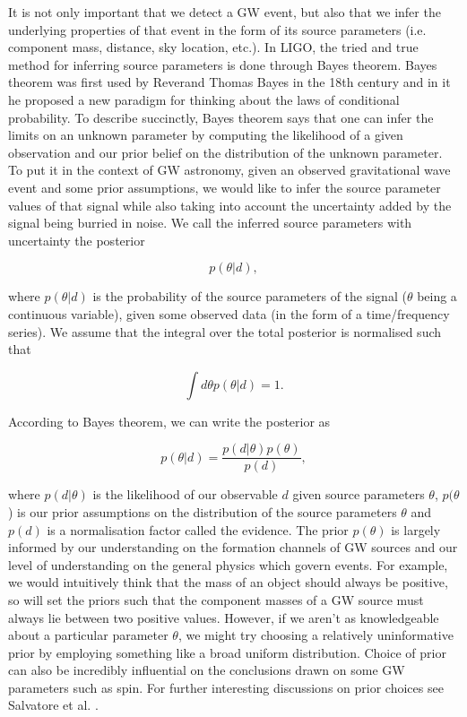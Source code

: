 %
%
It is not only important that we detect a \ac{GW} event, but also that we infer the underlying properties of that event in the form of its source parameters (i.e. component mass, distance, sky location, etc.). In \ac{LIGO}, the tried and true method for inferring source parameters is done through Bayes theorem. Bayes theorem was first used by Reverand Thomas Bayes in the 18th century and in it he proposed a new paradigm for thinking about the laws of conditional probability. To describe succinctly, Bayes theorem says that one can infer the limits on an unknown parameter by computing the likelihood of a given observation and our prior belief on the distribution of the unknown parameter. To put it in the context of \ac{GW} astronomy, given an observed gravitational wave event and some prior assumptions, we would like to infer the source parameter values of that signal while also taking into account the uncertainty added by the signal being burried in noise. We call the inferred source parameters with uncertainty the posterior 

%
%
\begin{equation}
    p(\theta | d),
\end{equation}

where $p(\theta | d)$ is the probability of the source parameters of the signal ($\theta$ being a continuous variable), given some observed data (in the form of a time/frequency series). We assume that the integral over the total posterior is normalised such that 

%
%
\begin{equation}
    \int d\theta p(\theta | d) = 1.
\end{equation}

According to Bayes theorem, we can write the posterior as 

%
%
\begin{equation}
    p(\theta | d) = \frac{p(d|\theta)p(\theta)}{p(d)},
\end{equation}

%
%
where $p(d|\theta)$ is the likelihood of our observable $d$ given source parameters $\theta$, $p(\theta$) is our prior assumptions on the distribution of the source parameters $\theta$ and $p(d)$ is a normalisation factor called the evidence. The prior $p(\theta)$ is largely informed by our understanding on the formation channels of \ac{GW} sources and our level of understanding on the general physics which govern events. For example, we would intuitively think that the mass of an object should always be positive, so will set the priors such that the component masses of a \ac{GW} source must always lie between two positive values. However, if we aren't as knowledgeable about a particular parameter $\theta$, we might try choosing a relatively uninformative prior by employing something like a broad uniform distribution. Choice of prior can also be incredibly influential on the conclusions drawn on some \ac{GW} parameters such as spin. For further interesting discussions on prior choices see Salvatore et al. \cite{PhysRevLett.119.251103}.

